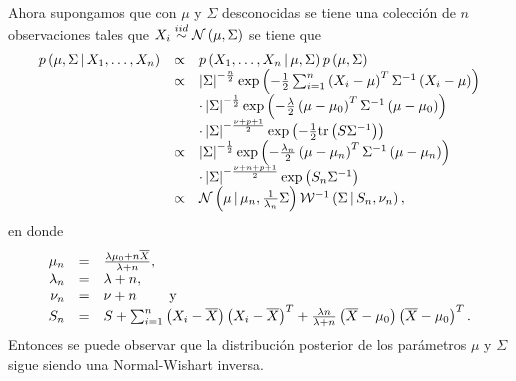 Ahora supongamos que con $\mu$ y $\Sigma$ desconocidas se tiene una colección de $n$ observaciones %
tales que $X_{i} \stackrel{iid}{\sim} \mathcal{N}\left( \mu, \Sigma \right)$ se tiene que
\[
\begin{array}{rcl}
p\Pp{\mu, \Sigma \,|\, \muestra{X}{n}} & \propto & p\Pp{\muestra{X}{n} \,|\, \mu, \Sigma} p\Pp{\mu, \Sigma} \\
& \propto & \abs{\Sigma}^{-\frac{n}{2}} \exp\Pp{-\frac{1}{2} \sum_{i = 1}^{n} \Pp{X_{i} - \mu}^{T} \Sigma^{-1} \Pp{X_{i} - %
\mu}} \\
& & \cdot \abs{\Sigma}^{-\frac{1}{2}} \exp\Pp{-\frac{\lambda}{2} \Pp{\mu - \mu_{0}}^{T} \Sigma^{-1} \Pp{\mu - \mu_{0}}} \\
& & \cdot \abs{\Sigma}^{-\frac{\nu + p + 1}{2}} \exp\Pp{-\frac{1}{2} \tr{S \Sigma^{-1}}} \\
& \propto &  \abs{\Sigma}^{-\frac{1}{2}} \exp\Pp{-\frac{\lambda_{n}}{2} \Pp{\mu - \mu_{n}}^{T} \Sigma^{-1} \Pp{\mu - \mu_{n}}} \\
& & \cdot \abs{\Sigma}^{-\frac{\nu + n + p + 1}{2}} \exp\Pp{S_{n} \Sigma^{-1}} \\
& \propto & \Nor\Pp{\mu \,|\, \mu_{n}, \frac{1}{\lambda_{n}} \Sigma} \iWis\Pp{\Sigma \,|\, S_{n}, \nu_{n}},
\end{array}
\]
en donde
\[
\begin{array}{rcl}
\mu_{n} & = & \frac{\lambda \mu_{0} + n \overline{X}}{\lambda + n},\\
\lambda_{n} & = & \lambda + n, \\
\nu_{n} & = & \nu + n \qquad \text{ y} \\
S_{n} & = & S + {\sum_{i = 1}^{n} \Pp{X_{i} - \overline{X}} \Pp{X_{i} - \overline{X}}^{T}} + \frac{\lambda n }{\lambda + n} %
\Pp{\overline{X} - \mu_{0}} \Pp{\overline{X} - \mu_{0}}^{T}.
\end{array}
\]
Entonces se puede observar que la distribución posterior de los parámetros $\mu$ y $\Sigma$ sigue siendo una Normal-Wishart %
inversa.